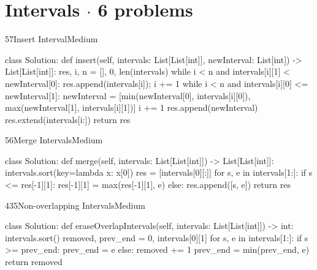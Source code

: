 \section{Intervals \texorpdfstring{{\normalsize\color{muted}$\cdot$ 6 problems}}{- 6 problems}}

\begin{problem}{57}{Insert Interval}{Medium}
\begin{code}
class Solution:
    def insert(self, intervals: List[List[int]], newInterval: List[int]) -> List[List[int]]:
        res, i, n = [], 0, len(intervals)
        while i < n and intervals[i][1] < newInterval[0]:
            res.append(intervals[i]); i += 1
        while i < n and intervals[i][0] <= newInterval[1]:
            newInterval = [min(newInterval[0], intervals[i][0]),
                           max(newInterval[1], intervals[i][1])]
            i += 1
        res.append(newInterval)
        res.extend(intervals[i:])
        return res
\end{code}
\end{problem}

\begin{problem}{56}{Merge Intervals}{Medium}
\begin{code}
class Solution:
    def merge(self, intervals: List[List[int]]) -> List[List[int]]:
        intervals.sort(key=lambda x: x[0])
        res = [intervals[0][:]]
        for s, e in intervals[1:]:
            if s <= res[-1][1]:
                res[-1][1] = max(res[-1][1], e)
            else:
                res.append([s, e])
        return res
\end{code}
\end{problem}

\begin{problem}{435}{Non-overlapping Intervals}{Medium}
\begin{code}
class Solution:
    def eraseOverlapIntervals(self, intervals: List[List[int]]) -> int:
        intervals.sort()
        removed, prev_end = 0, intervals[0][1]
        for s, e in intervals[1:]:
            if s >= prev_end:
                prev_end = e
            else:
                removed += 1
                prev_end = min(prev_end, e)
        return removed
\end{code}
\end{problem}

